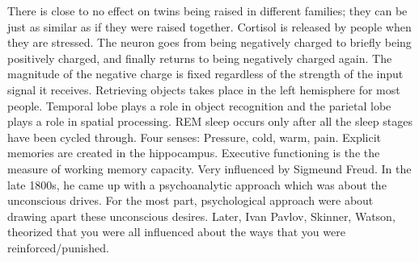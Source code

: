 \markdownRendererInterblockSeparator
{}\markdownRendererUlBeginTight
\markdownRendererUlItem There is close to no effect on twins being raised in different families; they can be just as similar as if they were raised together.\markdownRendererUlItemEnd 
\markdownRendererUlItem Cortisol is released by people when they are stressed.\markdownRendererUlItemEnd 
\markdownRendererUlItem The neuron goes from being negatively charged to briefly being positively charged, and finally returns to being negatively charged again. The magnitude of the negative charge is fixed regardless of the strength of the input signal it receives.\markdownRendererUlItemEnd 
\markdownRendererUlItem Retrieving objects takes place in the left hemisphere for most people.\markdownRendererUlItemEnd 
\markdownRendererUlItem Temporal lobe plays a role in object recognition and the parietal lobe plays a role in spatial processing.\markdownRendererUlItemEnd 
\markdownRendererUlItem REM sleep occurs only after all the sleep stages have been cycled through.\markdownRendererUlItemEnd 
\markdownRendererUlItem Four senses: Pressure, cold, warm, pain.\markdownRendererUlItemEnd 
\markdownRendererUlItem Explicit memories are created in the hippocampus.\markdownRendererUlItemEnd 
\markdownRendererUlItem Executive functioning is the the measure of working memory capacity.\markdownRendererUlItemEnd 
\markdownRendererUlEndTight \markdownRendererInterblockSeparator
{}\markdownRendererInterblockSeparator
{}\markdownRendererInterblockSeparator
{}\markdownRendererUlBeginTight
\markdownRendererUlItem Very influenced by Sigmeund Freud.\markdownRendererUlItemEnd 
\markdownRendererUlItem In the late 1800s, he came up with a psychoanalytic approach which was about the unconscious drives.\markdownRendererUlItemEnd 
\markdownRendererUlItem For the most part, psychological approach were about drawing apart these unconscious desires.\markdownRendererUlItemEnd 
\markdownRendererUlEndTight \markdownRendererInterblockSeparator
{}\markdownRendererInterblockSeparator
{}\markdownRendererUlBeginTight
\markdownRendererUlItem Later, Ivan Pavlov, Skinner, Watson, theorized that you were all influenced about the ways that you were reinforced/punished.\markdownRendererUlItemEnd 
\markdownRendererUlEndTight \markdownRendererInterblockSeparator
{}\markdownRendererInterblockSeparator
{}\markdownRendererUlBeginTight
